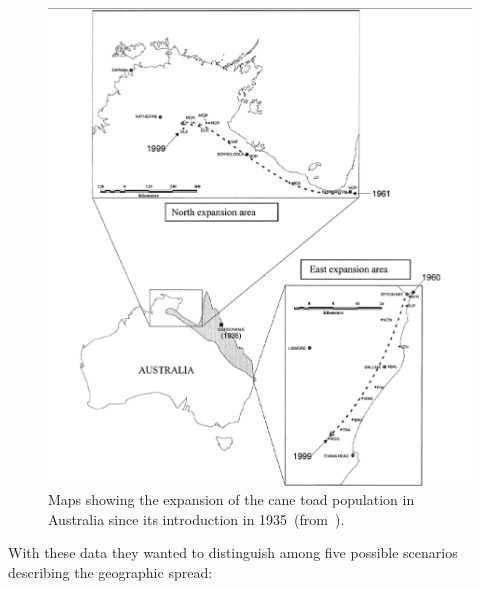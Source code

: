 \begin{figure}
\begin{center}
\includegraphics[width=6.0in]{cane-toad-expansion.eps}
\end{center}
\caption{Maps showing the expansion of the cane toad population in
  Australia since its introduction in 1935~(from~\cite{Estoup-etal-2004}).}\label{fig:cane-toad-expansion}
\end{figure}

With these data they wanted to distinguish among five possible
scenarios describing the geographic spread:

